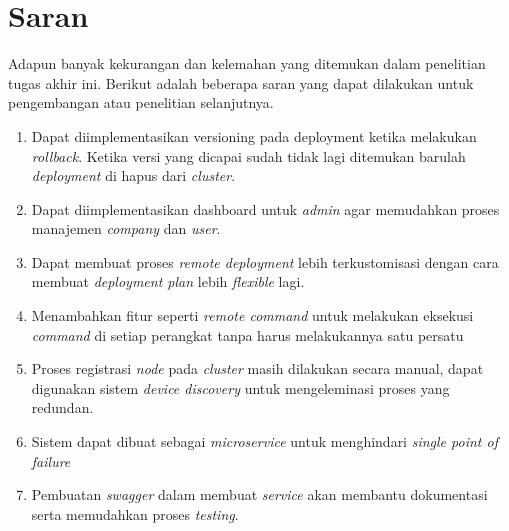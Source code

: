 \section{Saran}
Adapun banyak kekurangan dan kelemahan yang ditemukan dalam penelitian tugas akhir ini. Berikut adalah beberapa saran yang dapat dilakukan untuk pengembangan atau penelitian selanjutnya.
\begin{enumerate}
  \item Dapat diimplementasikan versioning pada deployment ketika melakukan \textit{rollback}. Ketika versi yang dicapai sudah tidak lagi ditemukan barulah \textit{deployment} di hapus dari \textit{cluster}.
  \item Dapat diimplementasikan dashboard untuk \textit{admin} agar memudahkan proses manajemen \textit{company} dan \textit{user}.
  \item Dapat membuat proses \textit{remote deployment} lebih terkustomisasi dengan cara membuat \textit{deployment plan} lebih \textit{flexible} lagi.
  \item Menambahkan fitur seperti \textit{remote command} untuk melakukan eksekusi \textit{command} di setiap perangkat tanpa harus melakukannya satu persatu
  \item Proses registrasi \textit{node} pada \textit{cluster} masih dilakukan secara manual, dapat digunakan sistem \textit{device discovery} untuk mengeleminasi proses yang redundan.
  \item Sistem dapat dibuat sebagai \textit{microservice} untuk menghindari \textit{single point of failure}
  \item Pembuatan \textit{swagger} dalam membuat \textit{service} akan membantu dokumentasi serta memudahkan proses \textit{testing}.
\end{enumerate}